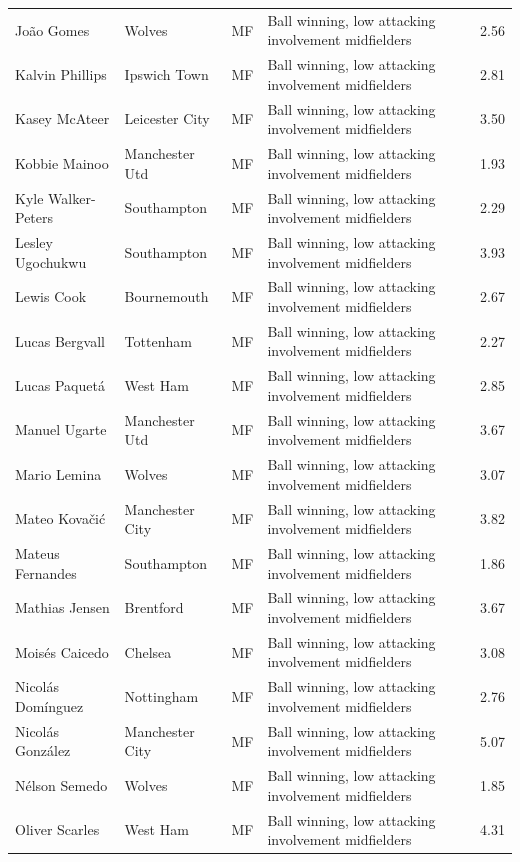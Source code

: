 \begin{longtable}{p{3.4cm}p{2.5cm}p{1.0cm}p{5.0cm}r}
João Gomes & Wolves & MF & Ball winning, low attacking involvement midfielders & 2.56 \\
Kalvin Phillips & Ipswich Town & MF & Ball winning, low attacking involvement midfielders & 2.81 \\
Kasey McAteer & Leicester City & MF & Ball winning, low attacking involvement midfielders & 3.50 \\
Kobbie Mainoo & Manchester Utd & MF & Ball winning, low attacking involvement midfielders & 1.93 \\
Kyle Walker-Peters & Southampton & MF & Ball winning, low attacking involvement midfielders & 2.29 \\
Lesley Ugochukwu & Southampton & MF & Ball winning, low attacking involvement midfielders & 3.93 \\
Lewis Cook & Bournemouth & MF & Ball winning, low attacking involvement midfielders & 2.67 \\
Lucas Bergvall & Tottenham & MF & Ball winning, low attacking involvement midfielders & 2.27 \\
Lucas Paquetá & West Ham & MF & Ball winning, low attacking involvement midfielders & 2.85 \\
Manuel Ugarte & Manchester Utd & MF & Ball winning, low attacking involvement midfielders & 3.67 \\
Mario Lemina & Wolves & MF & Ball winning, low attacking involvement midfielders & 3.07 \\
Mateo Kovačić & Manchester City & MF & Ball winning, low attacking involvement midfielders & 3.82 \\
Mateus Fernandes & Southampton & MF & Ball winning, low attacking involvement midfielders & 1.86 \\
Mathias Jensen & Brentford & MF & Ball winning, low attacking involvement midfielders & 3.67 \\
Moisés Caicedo & Chelsea & MF & Ball winning, low attacking involvement midfielders & 3.08 \\
Nicolás Domínguez & Nottingham & MF & Ball winning, low attacking involvement midfielders & 2.76 \\
Nicolás González & Manchester City & MF & Ball winning, low attacking involvement midfielders & 5.07 \\
Nélson Semedo & Wolves & MF & Ball winning, low attacking involvement midfielders & 1.85 \\
Oliver Scarles & West Ham & MF & Ball winning, low attacking involvement midfielders & 4.31 \\

\end{longtable}
